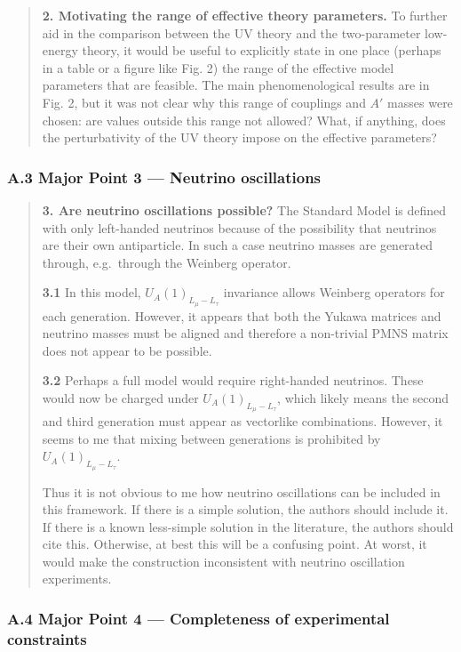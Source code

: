 \documentclass[
]{article}
\begin{document}
\begin{quote}
\textbf{2. Motivating the range of effective theory parameters.} To
further aid in the comparison between the UV theory and the
two-parameter low-energy theory, it would be useful to explicitly state
in one place (perhaps in a table or a figure like Fig. 2) the range of
the effective model parameters that are feasible. The main
phenomenological results are in Fig. 2, but it was not clear why this
range of couplings and \(A'\) masses were chosen: are values outside
this range not allowed? What, if anything, does the perturbativity of
the UV theory impose on the effective parameters?
\end{quote}

\subsubsection{A.3 Major Point 3 --- Neutrino
oscillations}\label{a.3-major-point-3-neutrino-oscillations}

\begin{quote}
\textbf{3. Are neutrino oscillations possible?} The Standard Model is
defined with only left-handed neutrinos because of the possibility that
neutrinos are their own antiparticle. In such a case neutrino masses are
generated through, e.g.~through the Weinberg operator.

\textbf{3.1} In this model, \(U_A(1)_{L_\mu-L_\tau}\) invariance allows
Weinberg operators for each generation. However, it appears that both
the Yukawa matrices and neutrino masses must be aligned and therefore a
non-trivial PMNS matrix does not appear to be possible.

\textbf{3.2} Perhaps a full model would require right-handed neutrinos.
These would now be charged under \(U_A(1)_{L_\mu-L_\tau}\), which likely
means the second and third generation must appear as vectorlike
combinations. However, it seems to me that mixing between generations is
prohibited by \(U_A(1)_{L_\mu-L_\tau}\).

Thus it is not obvious to me how neutrino oscillations can be included
in this framework. If there is a simple solution, the authors should
include it. If there is a known less-simple solution in the literature,
the authors should cite this. Otherwise, at best this will be a
confusing point. At worst, it would make the construction inconsistent
with neutrino oscillation experiments.
\end{quote}

\subsubsection{A.4 Major Point 4 --- Completeness of experimental
constraints}\label{a.4-major-point-4-completeness-of-experimental-constraints}
\end{document}
